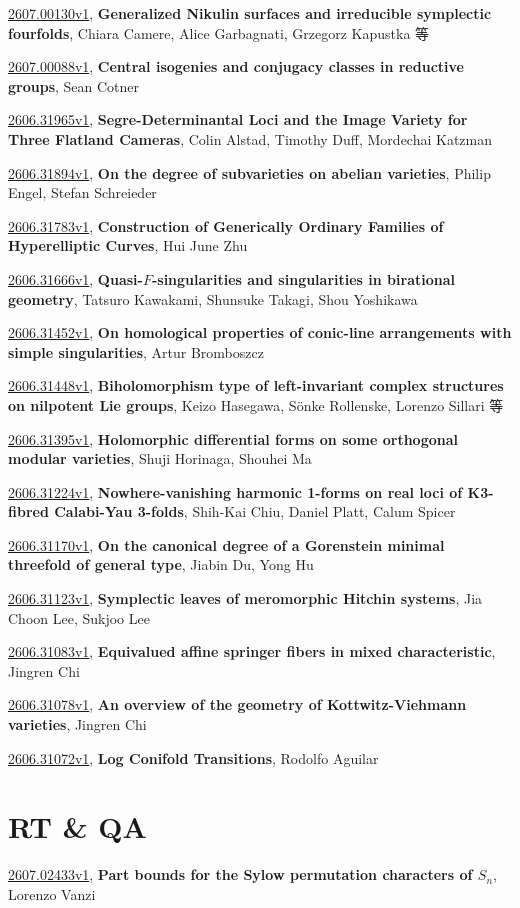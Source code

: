 \documentclass[9pt, a4paper]{article}
\theoremstyle{plain}
\theoremstyle{definition}
\theoremstyle{remark}
\newcommand{\arxiv}[3]{\href{https://arxiv.org/abs/#1}{#1}, \textbf{\textcolor{arxivblue}{#2}}, #3}
\begin{document}
\arxiv{2607.00130v1}{Generalized Nikulin surfaces and irreducible symplectic fourfolds}{Chiara Camere, Alice Garbagnati, Grzegorz Kapustka 等}

\arxiv{2607.00088v1}{Central isogenies and conjugacy classes in reductive groups}{Sean Cotner}

\arxiv{2606.31965v1}{Segre-Determinantal Loci and the Image Variety for Three Flatland Cameras}{Colin Alstad, Timothy Duff, Mordechai Katzman}

\arxiv{2606.31894v1}{On the degree of subvarieties on abelian varieties}{Philip Engel, Stefan Schreieder}

\arxiv{2606.31783v1}{Construction of Generically Ordinary Families of Hyperelliptic Curves}{Hui June Zhu}

\arxiv{2606.31666v1}{Quasi-$F$-singularities and singularities in birational geometry}{Tatsuro Kawakami, Shunsuke Takagi, Shou Yoshikawa}

\arxiv{2606.31452v1}{On homological properties of conic-line arrangements with simple singularities}{Artur Bromboszcz}

\arxiv{2606.31448v1}{Biholomorphism type of left-invariant complex structures on nilpotent Lie groups}{Keizo Hasegawa, Sönke Rollenske, Lorenzo Sillari 等}

\arxiv{2606.31395v1}{Holomorphic differential forms on some orthogonal modular varieties}{Shuji Horinaga, Shouhei Ma}

\arxiv{2606.31224v1}{Nowhere-vanishing harmonic 1-forms on real loci of K3-fibred Calabi-Yau 3-folds}{Shih-Kai Chiu, Daniel Platt, Calum Spicer}

\arxiv{2606.31170v1}{On the canonical degree of a Gorenstein minimal threefold of general type}{Jiabin Du, Yong Hu}

\arxiv{2606.31123v1}{Symplectic leaves of meromorphic Hitchin systems}{Jia Choon Lee, Sukjoo Lee}

\arxiv{2606.31083v1}{Equivalued affine springer fibers in mixed characteristic}{Jingren Chi}

\arxiv{2606.31078v1}{An overview of the geometry of Kottwitz-Viehmann varieties}{Jingren Chi}

\arxiv{2606.31072v1}{Log Conifold Transitions}{Rodolfo Aguilar}


\section{RT \& QA}
\arxiv{2607.02433v1}{Part bounds for the Sylow permutation characters of $S_n$}{Lorenzo Vanzi}
\end{document}
